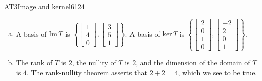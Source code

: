\begin{exercise}{AT3}{Image and kernel}{6124}
\begin{exerciseAnswer}
\begin{enumerate}[(a)]
 
\item  

 A basis of \(\mathrm{Im}\,T\) is \(\left\{ \left[\begin{array}{c}
1 \\
4 \\
0
\end{array}\right] , \left[\begin{array}{c}
3 \\
5 \\
1
\end{array}\right] \right\}\). A basis of \(\mathrm{ker}\,T\) is \(\left\{ \left[\begin{array}{c}
2 \\
0 \\
1 \\
0
\end{array}\right] , \left[\begin{array}{c}
-2 \\
2 \\
0 \\
1
\end{array}\right] \right\}\). 

 
\item  

 The rank of \(T\) is \(2\), the nullity of \(T\) is \(2\), and the dimension of the domain of \(T\) is \(4\). The rank-nullity theorem asserts that \(2+2=4\), which we see to be true. 

 
\end{enumerate}

     \end{exerciseAnswer}
 \end{exercise}



